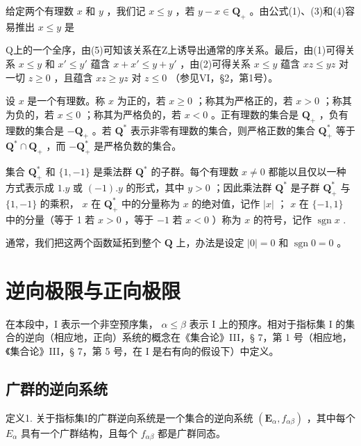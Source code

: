 给定两个有理数 \(x\) 和 \(y\) ，我们记 \(x \leqslant y\) ，若 \(y - x \in \mathbf{Q}_+\) 。由公式(1)、(3)和(4)容易推出 \(x \leqslant y\) 是

Q上的一个全序，由(5)可知该关系在Z上诱导出通常的序关系。最后，由(1)可得关系 \(x \leqslant y\) 和 \(x' \leqslant y'\) 蕴含 \(x + x' \leqslant y + y'\) ，由(2)可得关系 \(x \leqslant y\) 蕴含 \(xz \leqslant yz\) 对一切 \(z \geqslant 0\) ，且蕴含 \(xz \geqslant yz\) 对 \(z \leqslant 0\) （参见VI，§2，第1号）。

设 \(x\) 是一个有理数。称 \(x\) 为正的，若 \(x \geqslant 0\) ；称其为严格正的，若 \(x > 0\) ；称其为负的，若 \(x \leqslant 0\) ；称其为严格负的，若 \(x < 0\) 。正有理数的集合是 \(\mathbf{Q}_{+}\) ，负有理数的集合是 \(-\mathbf{Q}_{+}\) 。若 \(\mathbf{Q}^{*}\) 表示非零有理数的集合，则严格正数的集合 \(\mathbf{Q}_{+}^{*}\) 等于 \(\mathbf{Q}^{*} \cap \mathbf{Q}_{+}\) ，而 \(-\mathbf{Q}_{+}^{*}\) 是严格负数的集合。

集合 \(\mathbf{Q}_{+}^{*}\) 和 \(\{1, -1\}\) 是乘法群 \(\mathbf{Q}^{*}\) 的子群。每个有理数 \(x \neq 0\) 都能以且仅以一种方式表示成 \(1.y\) 或 \((-1).y\) 的形式，其中 \(y > 0\) ；因此乘法群 \(\mathbf{Q}^{*}\) 是子群 \(\mathbf{Q}_{+}^{*}\) 与 \(\{1, -1\}\) 的乘积， \(x\) 在 \(\mathbf{Q}_{+}^{*}\) 中的分量称为 \(x\) 的绝对值，记作 \(|x|\) ； \(x\) 在 \(\{-1, 1\}\) 中的分量（等于 1 若 \(x > 0\) ，等于 \(-1\) 若 \(x < 0\) ）称为 \(x\) 的符号，记作 \(\operatorname{sgn} x\) .

通常，我们把这两个函数延拓到整个 \(\mathbf{Q}\) 上，办法是设定 \(|0| = 0\) 和 \(\operatorname{sgn} 0 = 0\) 。

\section{逆向极限与正向极限}

在本段中，I 表示一个非空预序集， \(\alpha \leqslant \beta\) 表示 I 上的预序。相对于指标集 I 的集合的逆向（相应地，正向）系统的概念在《集合论》III，§ 7，第 1 号（相应地，《集合论》III，§ 7，第 5 号，在 I 是右有向的假设下）中定义。

\subsection{广群的逆向系统}

定义1. 关于指标集I的广群逆向系统是一个集合的逆向系统 \((\mathbf{E}_{\alpha}, f_{\alpha\beta})\) ，其中每个 \(E_{\alpha}\) 具有一个广群结构，且每个 \(f_{\alpha\beta}\) 都是广群同态。

